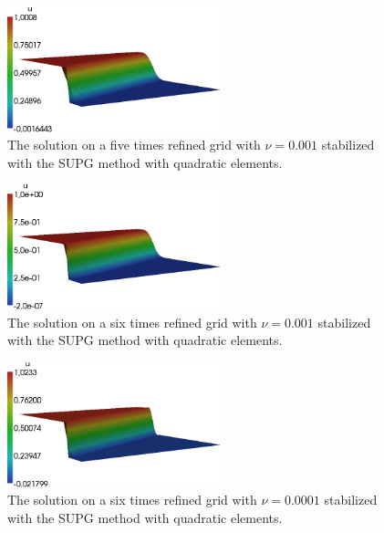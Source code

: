 \documentclass[a4paper, 11pt, twoside]{article}
\begin{document}
\begin{figure}[htbp]
\begin{center}
\includegraphics[width=0.55\textwidth]{fig/SUPG_5_0,001_quad.png}
\caption{The solution on a five times refined grid with $\nu = 0.001$ stabilized with the SUPG method with quadratic elements.}
\label{SUPGreflevel5_nu0,001}
\end{center}
\end{figure}

\begin{figure}[htbp]
\begin{center}
\includegraphics[width=0.55\textwidth]{fig/SUPG_6_0,001_quad.png}
\caption{The solution on a six times refined grid with $\nu = 0.001$ stabilized with the SUPG method with quadratic elements.}
\label{SUPGreflevel6_nu0,001}
\end{center}
\end{figure}

\begin{figure}[htbp]
\begin{center}
\includegraphics[width=0.55\textwidth]{fig/SUPG_6_0,0001_quad.png}
\caption{The solution on a six times refined grid with $\nu = 0.0001$ stabilized with the SUPG method with quadratic elements.}
\label{SUPGreflevel6_nu0,0001}
\end{center}
\end{figure}
\end{document}
